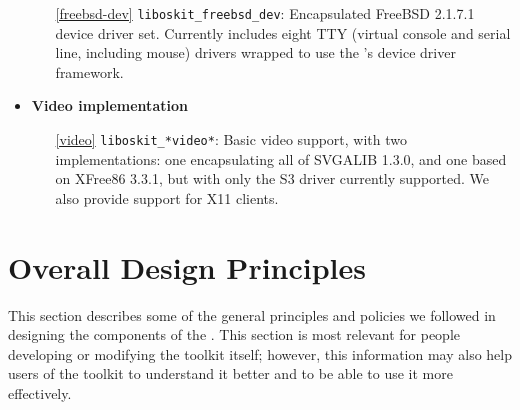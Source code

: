 \begin{itemize}
\begin{itemize}
\item[\ref{freebsd-dev}]	{\tt liboskit_freebsd_dev}:
	Encapsulated FreeBSD 2.1.7.1 device driver set.
	Currently includes eight TTY
	(virtual console and serial line, including mouse) drivers
	wrapped to use the \oskit's device driver framework.
\end{itemize}


\item {\bf Video implementation}
\begin{itemize}
\item[\ref{video}]	{\tt liboskit_*video*}:
	Basic video support, with two implementations: one encapsulating
	all of SVGALIB 1.3.0, and one based on XFree86 3.3.1, but with only the
	S3 driver currently supported.
	We also provide support for X11 clients.
\end{itemize}

\end{itemize}



\section{Overall Design Principles}

This section describes some of the general principles and policies
we followed in designing the components of the \oskit{}.
This section is most relevant for
people developing or modifying the toolkit itself;
however, this information may also help users of the toolkit
to understand it better and to be able to use it more effectively.

